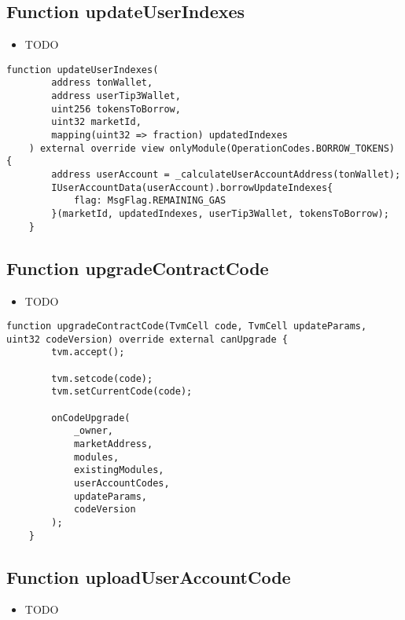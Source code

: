 \subsection{Function updateUserIndexes}

\noindent\begin{itemize}
\item TODO
\end{itemize}

\begin{lstlisting}[firstnumber=233]
    function updateUserIndexes(
        address tonWallet, 
        address userTip3Wallet, 
        uint256 tokensToBorrow, 
        uint32 marketId,
        mapping(uint32 => fraction) updatedIndexes
    ) external override view onlyModule(OperationCodes.BORROW_TOKENS) {
        address userAccount = _calculateUserAccountAddress(tonWallet);
        IUserAccountData(userAccount).borrowUpdateIndexes{
            flag: MsgFlag.REMAINING_GAS
        }(marketId, updatedIndexes, userTip3Wallet, tokensToBorrow);
    }
\end{lstlisting}

\subsection{Function upgradeContractCode}

\noindent\begin{itemize}
\item TODO
\end{itemize}

\begin{lstlisting}[firstnumber=56]
    function upgradeContractCode(TvmCell code, TvmCell updateParams, uint32 codeVersion) override external canUpgrade {
        tvm.accept();

        tvm.setcode(code);
        tvm.setCurrentCode(code);

        onCodeUpgrade(
            _owner,
            marketAddress,
            modules,
            existingModules,
            userAccountCodes,
            updateParams,
            codeVersion
        );
    }
\end{lstlisting}

\subsection{Function uploadUserAccountCode}

\noindent\begin{itemize}
\item TODO
\end{itemize}

